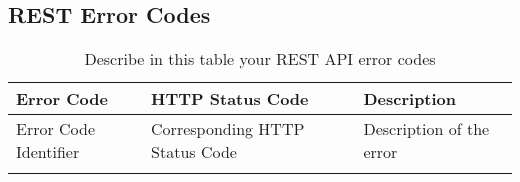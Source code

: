 \subsection{REST Error Codes}


\begin{longtable}{|p{}|p{} |p{}|} 
\hline
\textbf{Error Code} & \textbf{HTTP Status Code} & \textbf{Description} \\\hline
Error Code Identifier & Corresponding HTTP Status Code &  Description of the error \\\hline
\caption{Describe in this table your REST API error codes}
\label{tab:termGlossary}
\end{longtable}